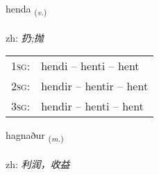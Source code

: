 \documentclass[frontgrid, backgrid]{flacards}\usepackage[]{graphicx}\usepackage[]{color}
\begin{document}
\renewcommand{\flhead}{\vskip5pt \fboxsep=0pt {\small\bfseries\footnotesize Sagnorð | 动词}}
\renewcommand{\fcfoot}{\vskip5pt \fboxsep=0pt \hspace{2pt}{\small\bfseries\footnotesize 2K}}

\renewcommand{\blhead}{\vskip5pt {\small\bfseries\footnotesize Sagnorð | 动词 }}
\renewcommand{\bcfoot}{\vskip5pt \hspace{2pt}{\small\bfseries\footnotesize 2K}}


{henda \small{\textsubscript{(\textit{v.})}} \\[1ex] %
\textphonetic{[hɛnta]} \\
zh: \emph{扔;抛} \\  [2ex]
\renewcommand*{\arraystretch}{0.8}
\begin{tabular}{p{1cm}l}
\textsc{1sg}: & hendi -- henti -- hent \\ 
\textsc{2sg}: & hendir -- hentir -- hent \\ 
\textsc{3sg}: & hendir -- henti -- hent \\ 
\end{tabular}
}

\renewcommand{\flhead}{\vskip5pt \fboxsep=0pt {\small\bfseries\footnotesize Nafnorð | 名词}}
\renewcommand{\fcfoot}{\vskip5pt \fboxsep=0pt \hspace{2pt}{\small\bfseries\footnotesize 2K}}

\renewcommand{\blhead}{\vskip5pt {\small\bfseries\footnotesize Nafnorð | 名词 }}
\renewcommand{\bcfoot}{\vskip5pt \hspace{2pt}{\small\bfseries\footnotesize 2K}}


{hagnaður \small{\textsubscript{(\textit{m.})}} \\[1ex] %
\textphonetic{[haknaðʏr]} \\
zh: \emph{利润，收益} \\  [2ex]
\renewcommand*{\arraystretch}{0.8}
}
\end{document}
